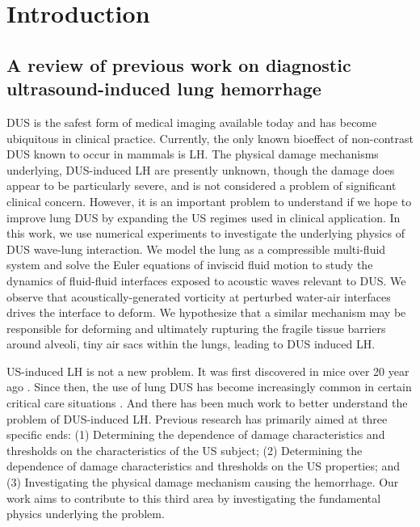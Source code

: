 \section{Introduction}
\label{sec:usbe_lung_introduction}
\subsection{A review of previous work on diagnostic ultrasound-induced lung hemorrhage}
\label{subsec:usbe_lung_bio_intro}
\ac{DUS} is the safest form of medical imaging available today and has
become ubiquitous in clinical practice. Currently, the only known
bioeffect of non-contrast \ac{DUS} known to occur in mammals is
\ac{LH}. The physical damage mechanisms underlying, \ac{DUS}-induced
\ac{LH} are presently unknown, though the damage does appear to be
particularly severe, and is not considered a problem of significant
clinical concern. However, it is an important problem to understand if
we hope to improve lung \ac{DUS} by expanding the US regimes used in
clinical application. In this work, we use numerical experiments to
investigate the underlying physics of \ac{DUS} wave-lung
interaction. We model the lung as a compressible multi-fluid system
and solve the Euler equations of inviscid fluid motion to study the
dynamics of fluid-fluid interfaces exposed to acoustic waves relevant
to \ac{DUS}. We observe that acoustically-generated vorticity at
perturbed water-air interfaces drives the interface to deform. We
hypothesize that a similar mechanism may be responsible for deforming
and ultimately rupturing the fragile tissue barriers around alveoli,
tiny air sacs within the lungs, leading to \ac{DUS} induced \ac{LH}.

\ac{US}-induced \ac{LH} is not a new problem. It was first discovered
in mice over 20 year ago \citep{Child1990}. Since then, the use of
lung \ac{DUS} has become increasingly common in certain critical care
situations \citep{Lichtenstein2009}. And there has been much work to
better understand the problem of \ac{DUS}-induced \ac{LH}. Previous
research has primarily aimed at three specific ends: (1) Determining
the dependence of damage characteristics and thresholds on the
characteristics of the \ac{US} subject; (2) Determining the dependence
of damage characteristics and thresholds on the \ac{US} properties;
and (3) Investigating the physical damage mechanism causing the
hemorrhage.  Our work aims to contribute to this third area by
investigating the fundamental physics underlying the problem.

